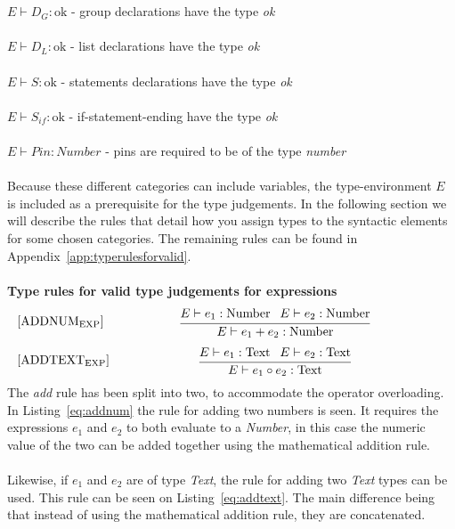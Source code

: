 \\\\
$E \vdash D_G : \text{ok}$ - group declarations have the type \textit{ok}
\\\\
$E \vdash D_L : \text{ok}$ - list declarations have the type \textit{ok}
\\\\
$E \vdash S : \text{ok}$ - statements declarations have the type \textit{ok}
\\\\
$E \vdash S_{if} : \text{ok}$ - if-statement-ending have the type \textit{ok}
\\\\
$E \vdash Pin : Number$ - pins are required to be of the type \textit{number}
\\\\
Because these different categories can include variables, the type-environment $E$ is included as a prerequisite for the type judgements. In the following section we will describe the rules that detail how you assign types to the syntactic elements for some chosen categories. The remaining rules can be found in Appendix~\ref{app:typerulesforvalid}.
\\\\
\textbf{Type rules for valid type judgements for expressions}
\begin{equation}\label{eq:addnum}
\begin{minipage}{.2\linewidth}
$[\text{ADDNUM}_\text{EXP}]$ 
\end{minipage}
\begin{minipage}{.8\linewidth}
\centering
$\cfrac{E \vdash e_1 : \text{Number } \: \: E \vdash e_2 : \text{Number}}{E \vdash e_1 + e_2 : \text{Number}}$
\end{minipage}
\end{equation}
\begin{equation}\label{eq:addtext}
\begin{minipage}{.2\linewidth}
$[\text{ADDTEXT}_\text{EXP}]$ 
\end{minipage}
\begin{minipage}{.8\linewidth}
\centering
$\cfrac{E \vdash e_1 : \text{Text } \: \: E \vdash e_2 : \text{Text}}{E \vdash e_1 \circ e_2 : \text{Text}}$
\end{minipage}
\end{equation}
\noindent
The \textit{add} rule has been split into two, to accommodate the operator overloading. In Listing~\ref{eq:addnum} the rule for adding two numbers is seen. 
It requires the expressions $e_1$ and $e_2$ to both evaluate to a \textit{Number}, in this case the numeric value of the two can be added together using the mathematical addition rule.
\\\\
Likewise, if $e_1$ and $e_2$ are of type \textit{Text}, the rule for adding two \textit{Text} types can be used. 
This rule can be seen on Listing~\ref{eq:addtext}. 
The main difference being that instead of using the mathematical addition rule, they are concatenated. 




